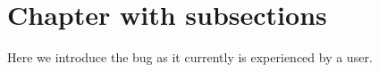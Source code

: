 \documentclass[../main.tex]{subfiles}
\begin{document}
\chapter{Chapter with subsections}
Here we introduce the bug as it currently is experienced by a user.


\end{document}
